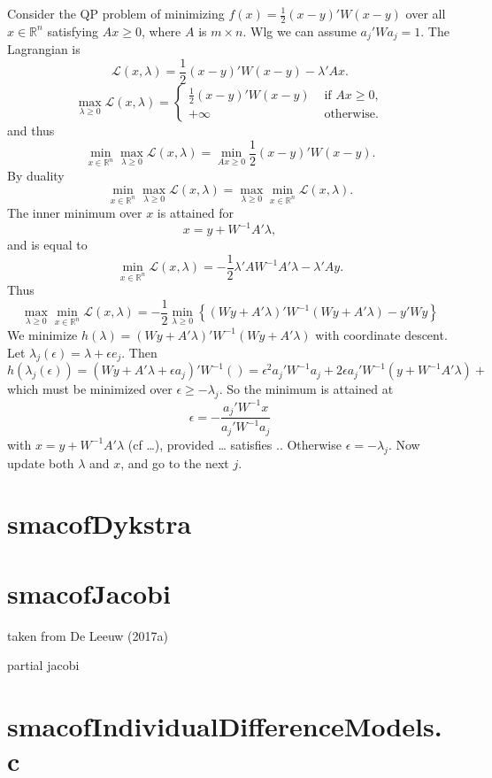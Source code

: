 \documentclass[
  12pt,
]{article}
\newcommand{\eps}{\epsilon}
\begin{document}
Consider the QP problem of minimizing \(f(x)=\frac12(x-y)'W(x-y)\)
over all \(x\in\mathbb{R}^n\) satisfying \(Ax\geq 0\), where \(A\) is \(m\times n\). Wlg we can assume \(a_j'Wa_j=1\). The Lagrangian is
\[
\mathcal{L}(x,\lambda)=\frac12(x-y)'W(x-y)-\lambda'Ax.
\]
\[
\max_{\lambda\geq 0}\mathcal{L}(x,\lambda)=\begin{cases}\frac12(x-y)'W(x-y)&\text{ if }Ax\geq 0,\\
+\infty&\text{ otherwise}.\end{cases}
\]
and thus
\[
\min_{x\in\mathbb{R}^n}\max_{\lambda\geq 0}\mathcal{L}(x,\lambda)=\min_{Ax\geq 0}\frac12(x-y)'W(x-y).
\]
By duality
\[
\min_{x\in\mathbb{R}^n}\max_{\lambda\geq 0}\mathcal{L}(x,\lambda)=\max_{\lambda\geq 0}\min_{x\in\mathbb{R}^n}\mathcal{L}(x,\lambda).
\]
The inner minimum over \(x\) is attained for
\[
x=y+W^{-1}A'\lambda,
\]
and is equal to
\[
\min_{x\in\mathbb{R}^n}\mathcal{L}(x,\lambda)=-\frac12\lambda'AW^{-1}A'\lambda-\lambda'Ay.
\]
Thus
\[
\max_{\lambda\geq 0}\min_{x\in\mathbb{R}^n}\mathcal{L}(x,\lambda)=
-\frac12\min_{\lambda\geq 0}\left\{(Wy+A'\lambda)'W^{-1}(Wy+A'\lambda)-y'Wy\right\}
\]
We minimize \(h(\lambda)=(Wy+A'\lambda)'W^{-1}(Wy+A'\lambda)\) with coordinate descent. Let \(\lambda_j(\eps)=\lambda+\eps e_j\). Then
\[
h(\lambda_j(\eps))=(Wy+A'\lambda+\eps a_j)'W^{-1}()=\eps^2a_j'W^{-1}a_j+2\eps a_j'W^{-1}(y+W^{-1}A'\lambda)+
\]
which must be minimized over \(\eps\geq-\lambda_j\). So the minimum is attained at
\[
\eps=-\frac{a_j'W^{-1}x}{a_j'W^{-1}a_j}
\]
with \(x=y+W^{-1}A'\lambda\) (cf \ldots), provided \ldots{} satisfies .. Otherwise \(\eps=-\lambda_j\). Now update both \(\lambda\) and \(x\),
and go to the next \(j\).

\section{smacofDykstra}\label{smacofdykstra}

\section{smacofJacobi}\label{smacofjacobi}

taken from De Leeuw (2017a)

partial jacobi

\section{smacofIndividualDifferenceModels.c}\label{smacofindividualdifferencemodels.c}
\end{document}

